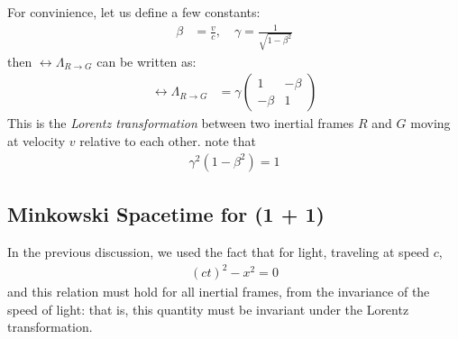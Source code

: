 For convinience, let us define a few constants:
\begin{align}
  \beta & = \frac{v}{c}, \quad \gamma = \frac{1}{\sqrt{1 - \beta^2}}
\end{align}
then $\rel{\Lambda}_{R \to G}$ can be written as:
\begin{align}
  \rel{\Lambda}_{R \to G} & = \gamma \begin{pmatrix}
                                       1      & -\beta \\
                                       -\beta & 1
                                     \end{pmatrix}
\end{align}
This is the \emph{Lorentz transformation} between two inertial frames $R$ and $G$ moving at velocity $v$ relative to each other.
note that
\begin{align}
  \gamma^2 (1 - \beta^2) = 1
\end{align}

\cite{geometry-spacetime}

\subsection{Minkowski Spacetime for (1 + 1)}
In the previous discussion, we used the fact that for light, traveling at speed $c$,
\begin{align}
  (ct)^2 - x^2 = 0
\end{align}
and this relation must hold for all inertial frames, from the invariance of the speed of light: that is,
this quantity must be invariant under the Lorentz transformation.


